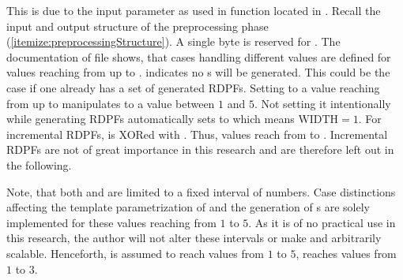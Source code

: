 This is due to the input parameter  as used in function  located in .
Recall the input and output structure of the preprocessing phase (\ref{itemize:preprocessingStructure}).
A single byte is reserved for .
The documentation of file  shows, that cases handling different  values are defined for values reaching from  up to .
 indicates no s will be generated.
This could be the case if one already has a set of generated RDPFs.
Setting  to a value reaching from  up to  manipulates  to a value between $1$ and $5$.
Not setting it intentionally while generating RDPFs automatically sets  to  which means $\text{WIDTH}=1$.
For incremental RDPFs,  is XORed with .
Thus, values reach from  to .
Incremental RDPFs are not of great importance in this research and are therefore left out in the following.

Note, that both  and  are limited to a fixed interval of numbers.
Case distinctions affecting the template parametrization of  and the generation of s are solely implemented for these  values reaching from $1$ to $5$.
As it is of no practical use in this research, the author will not alter these intervals or make  and  arbitrarily scalable.
Henceforth,  is assumed to reach values from $1$ to $5$,  reaches values from $1$ to $3$.